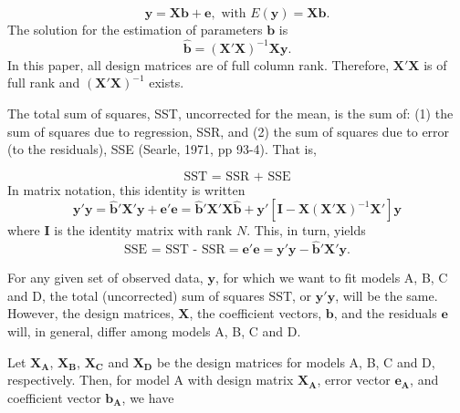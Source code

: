 \documentclass[11pt, oneside]{article}   	%
\begin{document}
\begin{equation}
\mathbf{y} = \mathbf{X}\mathbf{b} + \mathbf{e} , 
\mbox{    with       }
E(\mathbf{y}) =  \mathbf{X}\mathbf{b}. 
\end{equation} 
The solution for the estimation of parameters $\mathbf{b}$ is 
\begin{equation}
\mathbf{\hat{b}} = (\mathbf{X}'\mathbf{X})^{-1}\mathbf{X}\mathbf{y}.
\end{equation}
In this paper, all design matrices are of full column rank.  Therefore, $\mathbf{X}'\mathbf{X} $ is of full rank and $(\mathbf{X}'\mathbf{X})^{-1} $ exists.  

\bigskip

The total sum of squares, SST, uncorrected for the mean, is the sum of: (1) the sum of squares due to regression, SSR, and (2) the sum of squares due to error (to the residuals), SSE (Searle, 1971, pp 93-4).  That is, 

\begin{equation} 
\mbox{SST = SSR + SSE}
\end{equation} 
In matrix notation, this identity is written
\begin{equation}
\mathbf{y}'\mathbf{y} = \mathbf{\hat{b}}'\mathbf{X}'\mathbf{y} + \mathbf{e}'\mathbf{e} = \mathbf{\hat{b}}'\mathbf{X}'\mathbf{X}\mathbf{\hat{b}} + \mathbf{y} ' [\mathbf{I} - \mathbf{X}(\mathbf{X} ' \mathbf{X})^{-1} \mathbf{X} '] \mathbf{y}   
\end{equation} 
where $ \mathbf{I} $ is the identity matrix with rank $ N $.  This, in turn, yields
\begin{equation}
\mbox{SSE = SST - SSR} = \mathbf{e} ' \mathbf{e} = \mathbf{y} ' \mathbf{y}  - \mathbf{\hat{b}} ' \mathbf{X} ' \mathbf{y}. 
\end{equation} 

\bigskip
For any given set of observed data, $\mathbf{y}$, for which we want to fit models A, B, C and D, the total (uncorrected) sum of squares $ \mbox{SST}$, or $  \mathbf{y} ' \mathbf{y} $, will be the same.  However, the design matrices, $\mathbf{X} $, the coefficient vectors, $\mathbf{b} $, and the residuals $\mathbf{e} $ will, in general, differ among models A, B, C and D.  

\bigskip

Let $ \mathbf{X_{A}} $,  $  \mathbf{X_{B}}  $, $ \mathbf{X_{C}} $ and $ \mathbf{X_{D}} $ be the design matrices for models A, B, C and D, respectively.  Then, for  model A with design matrix $ \mathbf{X_{A}} $, error vector $ \mathbf{e_{A}} $, and coefficient vector $ \mathbf{b_{A}} $, we have 
\end{document}
